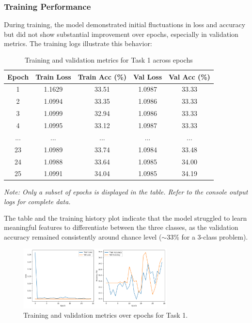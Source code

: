\documentclass[11pt,a4paper]{article}
\begin{document}
\subsubsection{Training Performance}
During training, the model demonstrated initial fluctuations in loss and accuracy but did not show substantial improvement over epochs, especially in validation metrics. The training logs illustrate this behavior:

\begin{table}[H]
    \centering
    \caption{Training and validation metrics for Task 1 across epochs}
    \label{tab:training_metrics_multi}
    \begin{tabular}{ccccc}
    \toprule
    \textbf{Epoch} & \textbf{Train Loss} & \textbf{Train Acc (\%)} & \textbf{Val Loss} & \textbf{Val Acc (\%)} \\
    \midrule
    1 & 1.1629 & 33.51 & 1.0987 & 33.33 \\
    2 & 1.0994 & 33.35 & 1.0986 & 33.33 \\
    3 & 1.0999 & 32.94 & 1.0986 & 33.33 \\
    4 & 1.0995 & 33.12 & 1.0987 & 33.33 \\
    ... & ... & ... & ... & ... \\
    23 & 1.0989 & 33.74 & 1.0984 & 33.48 \\
    24 & 1.0988 & 33.64 & 1.0985 & 34.00 \\
    25 & 1.0991 & 34.04 & 1.0985 & 34.19 \\
    \bottomrule
    \end{tabular}
\end{table}
\textit{Note: Only a subset of epochs is displayed in the table. Refer to the console output logs for complete data.}

The table and the training history plot indicate that the model struggled to learn meaningful features to differentiate between the three classes, as the validation accuracy remained consistently around chance level ($\sim$33\% for a 3-class problem).

\begin{figure}[H]
    \centering
    \includegraphics[width=0.7\textwidth]{../Task1/results/training_history_multi.png}
    \caption{Training and validation metrics over epochs for Task 1.}
    \label{fig:training_history_multi}
\end{figure}
\end{document}
